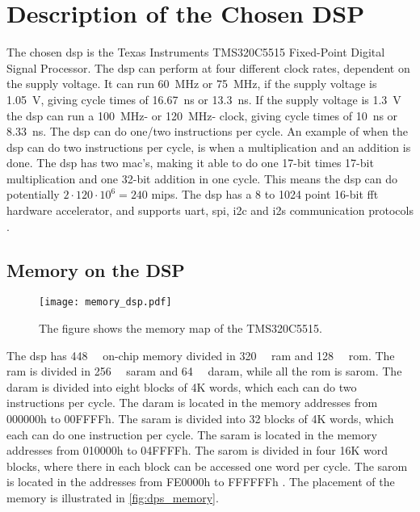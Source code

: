 \section{Description of the Chosen DSP}\label{sec:dsp_description}


The chosen \gls{dsp} is the Texas Instruments TMS320C5515 Fixed-Point Digital Signal Processor.
The \gls{dsp} can perform at four different clock rates, dependent on the supply voltage. It can run \SI{60}{\mega\hertz} or \SI{75}{\mega\hertz}, if the supply voltage is \SI{1.05}{\volt}, giving cycle times of \SI{16.67}{\nano\second} or \SI{13.3}{\nano\second}. If the supply voltage is \SI{1.3}{\volt} the \gls{dsp} can run a \SI{100}{\mega\hertz}- or \SI{120}{\mega\hertz}- clock, giving cycle times of \SI{10}{\nano\second} or \SI{8.33}{\nano\second}. The \gls{dsp} can do one/two instructions per cycle. An example of when the \gls{dsp} can do two instructions per cycle, is when a multiplication and an addition is done. The \gls{dsp} has two \gls{mac}'s, making it able to do one 17-bit times 17-bit multiplication and one 32-bit addition in one cycle. This means the \gls{dsp} can do potentially $2 \cdot 120 \cdot 10^6 = 240$ \gls{mips}. The \gls{dsp} has a 8 to 1024 point 16-bit \gls{fft} hardware accelerator, and supports \gls{uart}, \gls{spi}, \gls{i2c} and \gls{i2s} communication protocols \citep{c5515}.
\subsection{Memory on the DSP}
\begin{figure}[htbp!]
	\centering
		\texttt{[image: memory\_dsp.pdf]}
		\caption{The figure shows the memory map of the TMS320C5515.}
		\label{fig:dps_memory}
\end{figure}
The \gls{dsp} has \SI{448}{\kilo\byte} on-chip memory divided in \SI{320}{\kilo\byte} \gls{ram} and \SI{128}{\kilo\byte} \gls{rom}. The \gls{ram} is divided in \SI{256}{\kilo\byte} \gls{saram} and \SI{64}{\kilo\byte} \gls{daram}, while all the \gls{rom} is \gls{sarom}.
The \gls{daram} is divided into eight blocks of 4K words, which each can do two instructions per cycle. The \gls{daram} is located in the memory addresses from 000000h to 00FFFFh. The \gls{saram} is divided into 32 blocks of 4K words, which each can do one instruction per cycle. The \gls{saram} is located in the memory addresses from 010000h to 04FFFFh. The \gls{sarom} is divided in four 16K word blocks, where there in each block can be accessed one word per cycle. The \gls{sarom} is located in the addresses from FE0000h to FFFFFFh \cite{c5515}. The placement of the memory is illustrated in \autoref{fig:dps_memory}.
